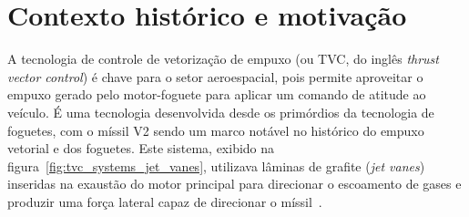 \section{Contexto histórico e motivação}


A tecnologia de controle de vetorização de empuxo (ou TVC, do inglês \textit{thrust vector control}) é chave para o setor aeroespacial, pois permite aproveitar o empuxo gerado pelo motor-foguete para aplicar um comando de atitude ao veículo. É uma tecnologia desenvolvida desde os primórdios da tecnologia de foguetes, com o míssil V2 sendo um marco notável no histórico do empuxo vetorial e dos foguetes. Este sistema, exibido na figura~\ref{fig:tvc_systems_jet_vanes}, utilizava lâminas de grafite (\textit{jet vanes}) inseridas na exaustão do motor principal para direcionar o escoamento de gases e produzir uma força lateral capaz de direcionar o míssil~\cite{V2jetvanes}.

